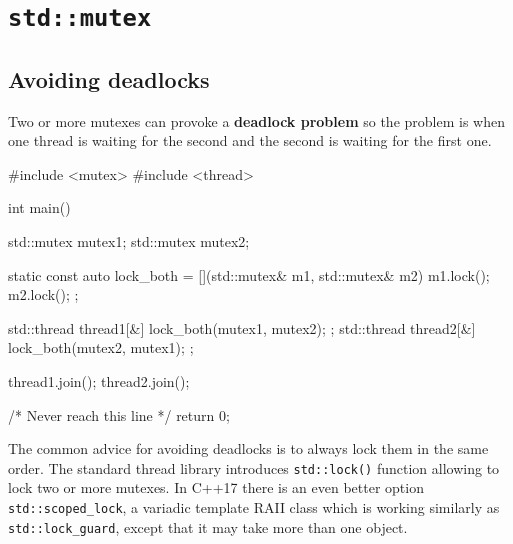 \documentclass[../main]{subfiles}
\begin{document}
\section{\texttt{std::mutex}}
\subsection{Avoiding deadlocks}
    Two or more mutexes can provoke a \textbf{deadlock problem} so the
problem is when one thread is waiting for the second and the second
is waiting for the first one.
\begin{Code}
    #include <mutex>
    #include <thread>

    int main()
    {
        std::mutex mutex1;
        std::mutex mutex2;

        static const auto lock_both = [](std::mutex& m1, std::mutex& m2)
        {
            m1.lock();
            m2.lock();
        };

        std::thread thread1{[&] { lock_both(mutex1, mutex2); }};
        std::thread thread2{[&] { lock_both(mutex2, mutex1); }};

        thread1.join();
        thread2.join();

        /* Never reach this line */
        return 0;
    }
\end{Code}

    The common advice for avoiding deadlocks is to always lock them
in the same order. The standard thread library introduces \texttt{std::lock()} function allowing
to lock two or more mutexes. In C++17 there is an even better option \texttt{std::scoped\_lock}, a variadic template RAII class which is working similarly
as \texttt{std::lock\_guard}, except that it may take more than one object.\newline
\end{document}

